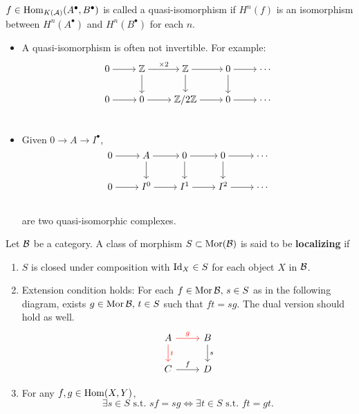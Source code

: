 \begin{definition}
  $f \in \operatorname{Hom}_{K(\mathcal{A})}(A^\bullet, B^\bullet)$ is called a quasi-isomorphism
  if $H^n(f)$ is an isomorphism between $H^n(A^\bullet)$ and $H^n(B^\bullet)$
  for each $n$.
\end{definition}

\begin{example}
  \begin{itemize}
    \item A quasi-isomorphism is often not invertible. For example:
    \[ \begin{tikzcd}[cramped]
        0 \ar[r] & \Zb \ar[r, "\times 2"] \ar[d] & \Zb \ar[r] \ar[d] & 0 \ar[r] \ar[d] & \cdots \\
        0 \ar[r] & 0 \ar[r] & \Zb / 2\Zb \ar[r] & 0 \ar[r] & \cdots \\
    \end{tikzcd} \]
    \item Given $0 \to A \to I^\bullet$,
      \[ \begin{tikzcd}[cramped]
          0 \ar[r] & A \ar[r] \ar[d] & 0 \ar[r] \ar[d] & 0 \ar[r] \ar[d] & \cdots \\
          0 \ar[r] & I^0 \ar[r] & I^1 \ar[r] & I^2 \ar[r] & \cdots \\
      \end{tikzcd} \]
    are two quasi-isomorphic complexes.
  \end{itemize}
\end{example}

\begin{definition}
  Let $\mathcal{B}$ be a category. A class of morphism $S \subset \operatorname{Mor}(\mathcal{B})$
  is said to be {\bf localizing} if
  \begin{enumerate}
    \item $S$ is closed under composition with ${\rm Id}_X \in S$ for each object $X$
      in $\mathcal{B}$.
    \item Extension condition holds: For each $f \in \operatorname{Mor} \mathcal{B}, \, s \in S$ as in the
      following diagram, exists $g \in \operatorname{Mor} \mathcal{B}, \, t \in S$ such that $ft = sg$.
      The dual version should hold as well.
      \[ \begin{tikzcd}
        A \ar[r, red, "g"] \ar[d, red, "t"] & B \ar[d, "s"] \\
        C \ar[r, "f"] & D
      \end{tikzcd} \]
    \item For any $f, g \in \operatorname{Hom}(X, Y)$,
      \[ \exists s \in S \text{ s.t. } sf = sg \iff \exists t \in S \text{ s.t. } ft = gt. \]
  \end{enumerate}
\end{definition}

